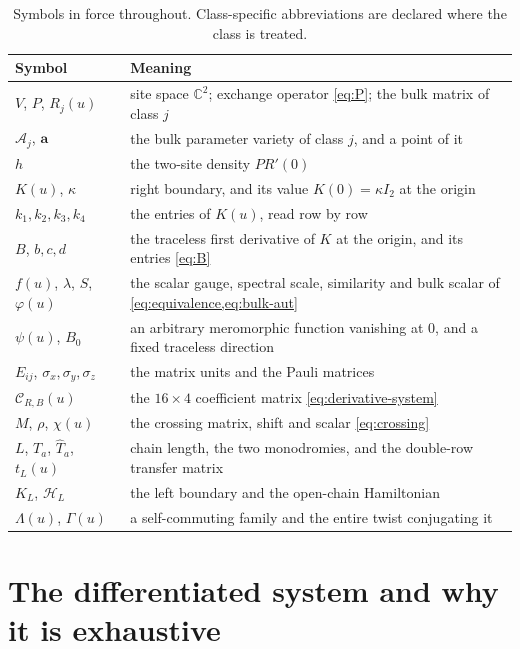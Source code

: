 \documentclass[11pt,reqno]{amsart}
\theoremstyle{plain}
\theoremstyle{definition}
\theoremstyle{remark}
\numberwithin{equation}{section}
\newcommand{\C}{\mathbb C}
\newcommand{\Id}{I_2}
\begin{document}
\begin{table}[t]
\centering
\caption{Symbols in force throughout. Class-specific abbreviations are declared
where the class is treated.}
\label{tab:symbols}
\begin{tabularx}{\textwidth}{l X}
\toprule
Symbol & Meaning \\
\midrule
$V$, $P$, $R_j(u)$ & site space $\C^2$; exchange operator \cref{eq:P}; the bulk matrix of class $j$ \\
$\mathcal A_j$, $\mathbf a$ & the bulk parameter variety of class $j$, and a point of it \\
$h$ & the two-site density $PR'(0)$ \\
$K(u)$, $\kappa$ & right boundary, and its value $K(0)=\kappa\Id$ at the origin \\
$k_1,k_2,k_3,k_4$ & the entries of $K(u)$, read row by row \\
$B$, $b,c,d$ & the traceless first derivative of $K$ at the origin, and its entries \cref{eq:B} \\
$f(u)$, $\lambda$, $S$, $\varphi(u)$ & the scalar gauge, spectral scale, similarity and bulk scalar of \cref{eq:equivalence,eq:bulk-aut} \\
$\psi(u)$, $B_0$ & an arbitrary meromorphic function vanishing at $0$, and a fixed traceless direction \\
$E_{ij}$, $\sigma_x,\sigma_y,\sigma_z$ & the matrix units and the Pauli matrices \\
$\mathcal C_{R,B}(u)$ & the $16\times4$ coefficient matrix \cref{eq:derivative-system} \\
$M$, $\rho$, $\chi(u)$ & the crossing matrix, shift and scalar \cref{eq:crossing} \\
$L$, $T_a$, $\widehat T_a$, $t_L(u)$ & chain length, the two monodromies, and the double-row transfer matrix \\
$K_L$, $\mathcal H_L$ & the left boundary and the open-chain Hamiltonian \\
$\Lambda(u)$, $\Gamma(u)$ & a self-commuting family and the entire twist conjugating it \\
\bottomrule
\end{tabularx}
\end{table}

\section{The differentiated system and why it is exhaustive}
\label{sec:exhaustiveness}
\end{document}
